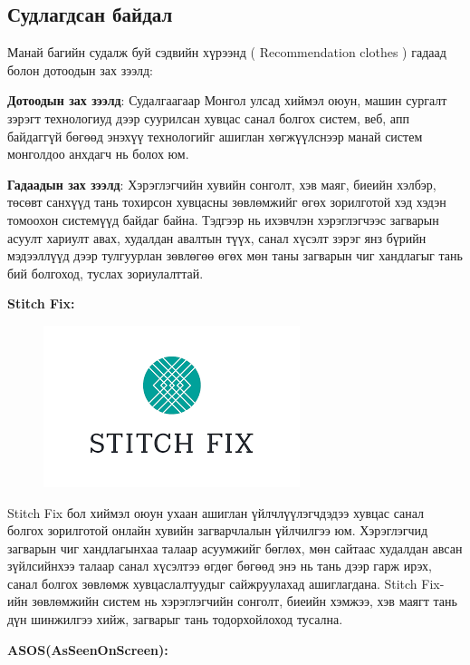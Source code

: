 \subsection*{Судлагдсан байдал}
\par Манай багийн судалж буй сэдвийн хүрээнд ( Recommendation clothes ) гадаад болон дотоодын зах зээлд:
\par \textbf{Дотоодын зах зээлд}:  Судалгаагаар Монгол улсад хиймэл оюун, машин сургалт зэрэгт технологиуд дээр суурилсан хувцас санал болгох систем, веб, апп байдаггүй бөгөөд энэхүү технологийг ашиглан хөгжүүлснээр манай систем монголдоо анхдагч нь болох юм. 
\par \textbf{Гадаадын зах зээлд}: Хэрэглэгчийн хувийн сонголт, хэв маяг, биеийн хэлбэр, төсөвт санхүүд тань тохирсон хувцасны зөвлөмжийг өгөх зорилготой хэд хэдэн томоохон системүүд байдаг байна. Тэдгээр нь ихэвчлэн хэрэглэгчээс загварын асуулт хариулт авах, худалдан авалтын түүх, санал хүсэлт зэрэг янз бүрийн мэдээллүүд дээр тулгуурлан зөвлөгөө өгөх мөн таны загварын чиг хандлагыг тань бий болгоход, туслах зориулалттай.
\par \textbf{Stitch Fix:}
\begin{figure}[!http]
	\includegraphics[scale=1]{figures/download.png}
\end{figure}
\par Stitch Fix бол хиймэл оюун ухаан ашиглан үйлчлүүлэгчдэдээ хувцас санал болгох зорилготой онлайн хувийн загварчлалын үйлчилгээ юм. Хэрэглэгчид загварын чиг хандлагынхаа талаар асуумжийг бөглөх, мөн сайтаас худалдан авсан зүйлсийнхээ талаар санал хүсэлтээ өгдөг бөгөөд энэ нь тань дээр гарж ирэх, санал болгох зөвлөмж хувцаслалтуудыг сайжруулахад ашиглагдана. Stitch Fix-ийн зөвлөмжийн систем нь хэрэглэгчийн сонголт, биеийн хэмжээ, хэв маягт тань дүн шинжилгээ хийж, загварыг тань тодорхойлоход тусална.
\par \textbf{ASOS(AsSeenOnScreen):}
